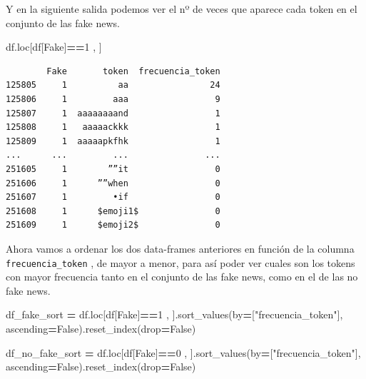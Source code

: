 \documentclass[
  11pt,
  a4paper,
]{article}
\newenvironment{Shaded}{\begin{snugshade}}{\end{snugshade}}
\newcommand{\DecValTok}[1]{\textcolor[rgb]{0.00,0.00,0.81}{#1}}
\newcommand{\NormalTok}[1]{#1}
\newcommand{\OperatorTok}[1]{\textcolor[rgb]{0.81,0.36,0.00}{\textbf{#1}}}
\newcommand{\StringTok}[1]{\textcolor[rgb]{0.31,0.60,0.02}{#1}}
\newcommand{\VariableTok}[1]{\textcolor[rgb]{0.00,0.00,0.00}{#1}}
\begin{document}
Y en la siguiente salida podemos ver el nº de veces que aparece cada
token en el conjunto de las fake news.

\begin{Shaded}
\begin{Highlighting}[]
\NormalTok{df.loc[df[}\StringTok{\textquotesingle{}Fake\textquotesingle{}}\NormalTok{]}\OperatorTok{==}\DecValTok{1}\NormalTok{ , ] }
\end{Highlighting}
\end{Shaded}

\begin{verbatim}
        Fake       token  frecuencia_token
125805     1          aa                24
125806     1         aaa                 9
125807     1  aaaaaaaand                 1
125808     1   aaaaackkk                 1
125809     1  aaaaapkfhk                 1
...      ...         ...               ...
251605     1        ””it                 0
251606     1      ””when                 0
251607     1         •if                 0
251608     1      $emoji1$               0
251609     1      $emoji2$               0
\end{verbatim}

Ahora vamos a ordenar los dos data-frames anteriores en función de la
columna \texttt{frecuencia\_token} , de mayor a menor, para así poder
ver cuales son los tokens con mayor frecuencia tanto en el conjunto de
las fake news, como en el de las no fake news.

\begin{Shaded}
\begin{Highlighting}[]
\NormalTok{df\_fake\_sort }\OperatorTok{=}\NormalTok{ df.loc[df[}\StringTok{\textquotesingle{}Fake\textquotesingle{}}\NormalTok{]}\OperatorTok{==}\DecValTok{1}\NormalTok{ , ].sort\_values(by}\OperatorTok{=}\NormalTok{[}\StringTok{"frecuencia\_token"}\NormalTok{], ascending}\OperatorTok{=}\VariableTok{False}\NormalTok{).reset\_index(drop}\OperatorTok{=}\VariableTok{False}\NormalTok{)}
\end{Highlighting}
\end{Shaded}

\begin{Shaded}
\begin{Highlighting}[]
\NormalTok{df\_no\_fake\_sort }\OperatorTok{=}\NormalTok{ df.loc[df[}\StringTok{\textquotesingle{}Fake\textquotesingle{}}\NormalTok{]}\OperatorTok{==}\DecValTok{0}\NormalTok{ , ].sort\_values(by}\OperatorTok{=}\NormalTok{[}\StringTok{"frecuencia\_token"}\NormalTok{], ascending}\OperatorTok{=}\VariableTok{False}\NormalTok{).reset\_index(drop}\OperatorTok{=}\VariableTok{False}\NormalTok{)}
\end{Highlighting}
\end{Shaded}
\end{document}
